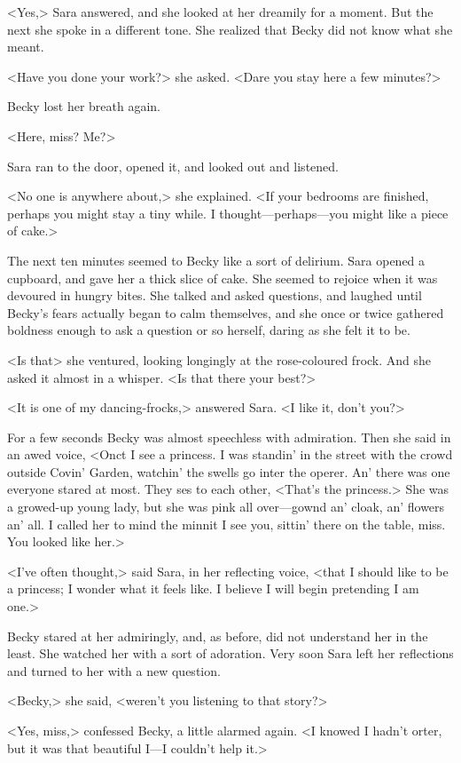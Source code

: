 <Yes,> Sara answered, and she looked at her dreamily for a moment. But the next she spoke in a different tone. She realized that Becky did not know what she meant.

<Have you done your work?> she asked. <Dare you stay here a few minutes?>

Becky lost her breath again.

<Here, miss? Me?>

Sara ran to the door, opened it, and looked out and listened.

<No one is anywhere about,> she explained. <If your bedrooms are finished, perhaps you might stay a tiny while. I thought—perhaps—you might like a piece of cake.>

The next ten minutes seemed to Becky like a sort of delirium. Sara opened a cupboard, and gave her a thick slice of cake. She seemed to rejoice when it was devoured in hungry bites. She talked and asked questions, and laughed until Becky's fears actually began to calm themselves, and she once or twice gathered boldness enough to ask a question or so herself, daring as she felt it to be.

<Is that\longdash> she ventured, looking longingly at the rose-coloured frock. And she asked it almost in a whisper. <Is that there your best?>

<It is one of my dancing-frocks,> answered Sara. <I like it, don't you?>

For a few seconds Becky was almost speechless with admiration. Then she said in an awed voice, <Onct I see a princess. I was standin' in the street with the crowd outside Covin' Garden, watchin' the swells go inter the operer. An' there was one everyone stared at most. They ses to each other, <That's the princess.> She was a growed-up young lady, but she was pink all over—gownd an' cloak, an' flowers an' all. I called her to mind the minnit I see you, sittin' there on the table, miss. You looked like her.>

<I've often thought,> said Sara, in her reflecting voice, <that I should like to be a princess; I wonder what it feels like. I believe I will begin pretending I am one.>

Becky stared at her admiringly, and, as before, did not understand her in the least. She watched her with a sort of adoration. Very soon Sara left her reflections and turned to her with a new question.

<Becky,> she said, <weren't you listening to that story?>

<Yes, miss,> confessed Becky, a little alarmed again. <I knowed I hadn't orter, but it was that beautiful I—I couldn't help it.>

